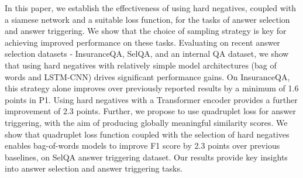 In this paper, we establish the effectiveness of using hard negatives, coupled with a siamese network and a suitable loss function, for the tasks of answer selection and answer triggering. We show that the choice of sampling strategy is key for achieving improved performance on these tasks. Evaluating on recent answer selection datasets - InsuranceQA, SelQA, and an internal QA dataset, we show that using hard negatives with relatively simple model architectures (bag of words and LSTM-CNN) drives significant performance gains. On InsuranceQA, this strategy alone improves over previously reported results by a minimum of 1.6 points in P\@1. Using hard negatives with a Transformer encoder provides a further improvement of 2.3 points.  Further, we propose to use quadruplet loss for answer triggering, with the aim of producing globally meaningful similarity scores. We show that quadruplet loss function coupled with the selection of hard negatives enables bag-of-words models to improve F1 score by 2.3 points over previous baselines, on SelQA answer triggering dataset. Our results provide key insights into answer selection and answer triggering tasks.